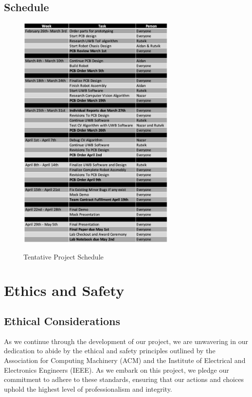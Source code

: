 \documentclass[journal,onecolumn, draftclsnofoot, 12pt]{IEEEtran}
\begin{document}
\subsection{Schedule}

\begin{figure}[H]
\begin{center}
    \includegraphics[width=0.7\textwidth]{Schedule.png}\\
    \caption{ Tentative Project Schedule  } 
    \label{fig:Schedule}
\end{center}
\end{figure}

\newpage

\section{Ethics and Safety}
\subsection{Ethical Considerations}
As we continue through the development of our project, we are unwavering in our dedication to abide by the ethical and safety principles outlined by the Association for Computing Machinery (ACM) and the Institute of Electrical and Electronics Engineers (IEEE). As we embark on this project, we pledge our commitment to adhere to these standards, ensuring that our actions and choices uphold the highest level of professionalism and integrity.
\end{document}

